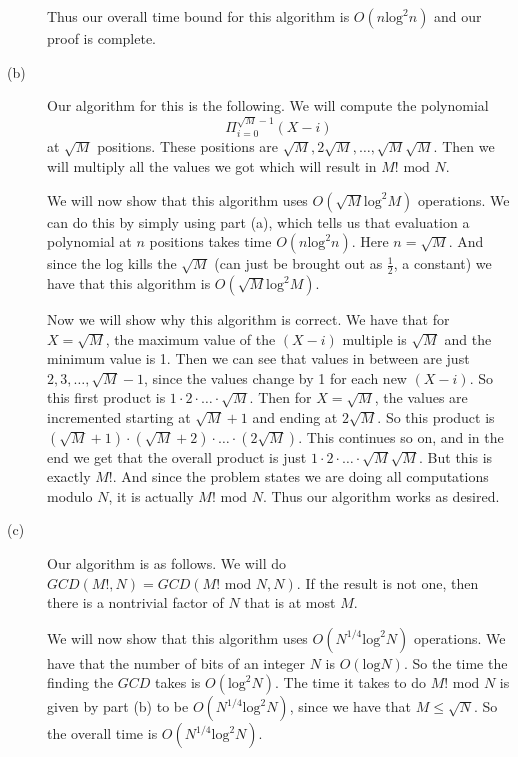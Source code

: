 \documentclass{article}
\begin{document}
\begin{description}
        Thus our overall time bound for this algorithm is $O(n\text{log}^2n)$ and our
        proof is complete.
    \item[(b)]
        Our algorithm for this is the following. We will compute the polynomial
        \[ \Pi_{i=0}^{\sqrt{M} - 1} (X - i) \]
        at $\sqrt{M}$ positions. These positions are $\sqrt{M}, 2\sqrt{M},
        \dots, \sqrt{M}\sqrt{M}$. Then we will multiply all the values we got
        which will result in $M! \text{ mod }N$.

        We will now show that this algorithm uses $O(\sqrt{M}\text{log}^2M)$
        operations. We can do this by simply using part (a), which tells us that
        evaluation a polynomial at $n$ positions takes time $O(n\text{log}^2n)$.
        Here $n = \sqrt{M}$. And since the log kills the $\sqrt{M}$ (can just be
        brought out as $\frac{1}{2}$, a constant) we have that this algorithm is
        $O(\sqrt{M}\text{log}^2M)$.

        Now we will show why this algorithm is correct. We have that for
        $X = \sqrt{M}$, the maximum value of the $(X - i)$ multiple is $\sqrt{M}$
        and the minimum value is 1. Then we can see that values in between
        are just $2, 3, \dots, \sqrt{M} - 1$, since the values change by 1 for
        each new $(X - i)$. So this first product is $1 \cdot 2 \cdot \dots
        \cdot \sqrt{M}$.
        Then for $X = \sqrt{M}$, the values
        are incremented starting at $\sqrt{M} + 1$ and ending at $2\sqrt{M}$.
        So this product is $(\sqrt{M} + 1) \cdot (\sqrt{M} + 2) \cdot \dots \cdot
        (2 \sqrt{M})$.
        This continues so on, and in the end we get that the overall product
        is just $1 \cdot 2 \cdot \dots \cdot \sqrt{M}\sqrt{M}$. But this is
        exactly $M!$. And since the problem states we are doing all computations
        modulo $N$, it is actually $M! \text{ mod }N$. Thus our algorithm works
        as desired.
    \item[(c)]
        Our algorithm is as follows. We will do $GCD(M!,N) = GCD(M! \text{ mod
        }N, N)$. If the result is not one, then there is a nontrivial factor of $N$
        that is at most $M$.

        We will now show that this algorithm uses $O(N^{1/4}\text{log}^2N)$
        operations. We have that the number of bits of an integer $N$ is
        $O(\text{log}N)$. So the time the finding the $GCD$ takes is
        $O(\text{log}^2N)$. The time it takes to do $M! \text{ mod }N$ is given
        by part (b) to be $O(N^{1/4}\text{log}^2N)$, since we have that
        $M \leq \sqrt{N}$. So the overall time is $O(N^{1/4}\text{log}^2N)$.


\end{description}
\end{document}
